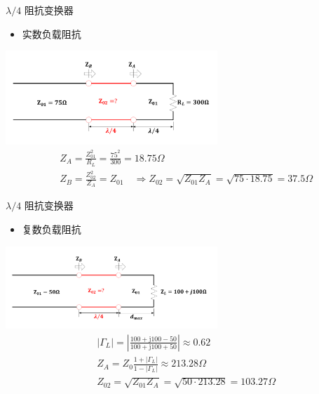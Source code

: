 \begin{frame}{$\lambda/4$ 阻抗变换器}
  \begin{itemize}
    \item 实数负载阻抗
  \end{itemize}
  \centering
  \includegraphics[width=8cm]{fig4-28.pdf}
  \begin{align*}
     & Z_A=\frac{Z_{01}^2}{R_L}=\frac{75^2}{300}=18.75\Omega                                                    \\
     & Z_B=\frac{Z_{02}^2}{Z_A}=Z_{01}\quad \Rightarrow Z_{02}=\sqrt{Z_{01}Z_A}=\sqrt{75\cdot 18.75}=37.5\Omega
  \end{align*}
\end{frame}

\begin{frame}{$\lambda/4$ 阻抗变换器}
  \begin{itemize}
    \item 复数负载阻抗
  \end{itemize}
  \centering
  \includegraphics[width=8cm]{fig4-29.pdf}
  \begin{align*}
     & \lvert \Gamma_L \rvert = \left\lvert \frac{100+\mathrm{j}100-50}{100+\mathrm{j}100+50}\right\rvert \approx 0.62 \\
     & Z_A=Z_0 \frac{1+\lvert \Gamma_L\rvert}{1-\lvert \Gamma_L\rvert}\approx 213.28\Omega \\
     & Z_{02}=\sqrt{Z_{01}Z_A}=\sqrt{50\cdot 213.28}=103.27\Omega
  \end{align*}
\end{frame}

